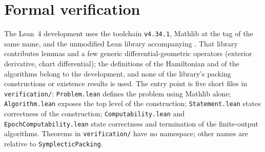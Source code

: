 \section{Formal verification}\label{sec:ver}
\begingroup\sloppy

The Lean~4 development \cite{LeanRepo,Lean4} uses the toolchain \texttt{v4.34.1}, Mathlib \cite{Mathlib2020} at
the tag of the same name, and the unmodified Lean library accompanying \cite{OpenAI2026}. That library contributes lemmas and a few generic
differential-geometric operators (exterior derivative, chart differential); the definitions of the Hamiltonian and of
the algorithms belong to the development, and none of the library's packing constructions or existence results is
used. The entry
point is five short files in \texttt{verification/}: \texttt{Problem.lean} defines the problem using Mathlib alone;
\texttt{Algorithm.lean} exposes the top level of the construction; \texttt{Statement.lean} states correctness of the
construction; \texttt{Computability.lean} and \texttt{EpochComputability.lean} state correctness and termination of the
finite-output algorithms. Theorems in \texttt{verification/} have no namespace; other names are relative to
\texttt{SymplecticPacking}.


